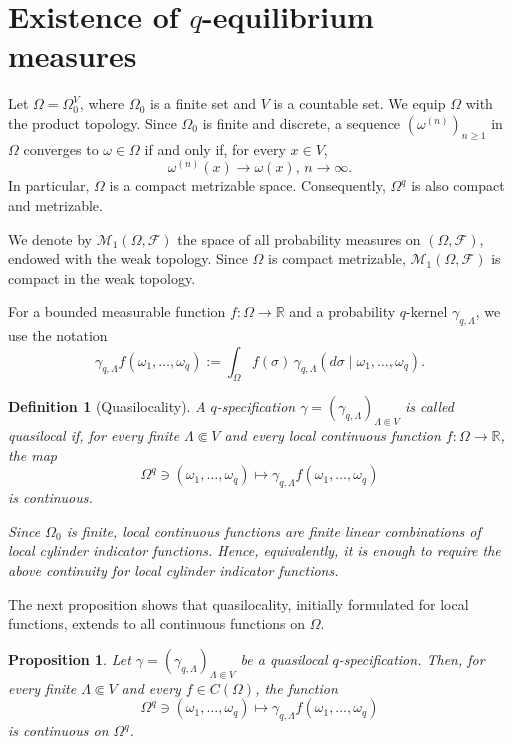 \documentclass[11pt,reqno]{amsart}
\newtheorem{defn}{Definition}
\newtheorem{pro}{Proposition}
\numberwithin{equation}{section} \setcounter{tocdepth}{1}
\begin{document}
\section{Existence of $q$-equilibrium measures}
\label{sec:existence}

Let $\Omega=\Omega_0^V$, where $\Omega_0$ is a finite set and $V$ is a
countable set. We equip $\Omega$ with the product topology. Since
$\Omega_0$ is finite and discrete, a sequence
$(\omega^{(n)})_{n\ge1}$ in $\Omega$ converges to $\omega\in\Omega$ if and
only if, for every $x\in V$,
\[
\omega^{(n)}(x)\to\omega(x), \, n\to\infty.
\]
In particular, $\Omega$ is a compact metrizable space. Consequently,
$\Omega^q$ is also compact and metrizable.

We denote by $\mathcal M_1(\Omega,\mathcal F)$ the space of all
probability measures on $(\Omega,\mathcal F)$, endowed with the weak
topology. Since $\Omega$ is compact metrizable,
$\mathcal M_1(\Omega,\mathcal F)$ is compact in the weak topology.

For a bounded measurable function $f:\Omega\to\mathbb R$ and a
probability $q$-kernel $\gamma_{q,\Lambda}$, we use the notation
\[
\gamma_{q,\Lambda}f(\omega_1,\ldots,\omega_q)
:=
\int_\Omega
f(\sigma)\,
\gamma_{q,\Lambda}
(d\sigma\mid\omega_1,\ldots,\omega_q).
\]

\begin{defn}[Quasilocality]
	A $q$-specification
	$\gamma=(\gamma_{q,\Lambda})_{\Lambda\Subset V}$ is called
	\emph{quasilocal} if, for every finite $\Lambda\Subset V$ and every
	local continuous function $f:\Omega\to\mathbb R$, the map
	\[
	\Omega^q\ni(\omega_1,\ldots,\omega_q)
	\longmapsto
	\gamma_{q,\Lambda}f(\omega_1,\ldots,\omega_q)
	\]
	is continuous.
	
	Since $\Omega_0$ is finite, local continuous functions are finite
	linear combinations of local cylinder indicator functions. Hence,
	equivalently, it is enough to require the above continuity for local
	cylinder indicator functions.
\end{defn}

The next proposition shows that quasilocality, initially formulated for
local functions, extends to all continuous functions on $\Omega$.

\begin{pro}\label{ql-extension}
	Let $\gamma=(\gamma_{q,\Lambda})_{\Lambda\Subset V}$ be a
	quasilocal $q$-specification. Then, for every finite
	$\Lambda\Subset V$ and every $f\in C(\Omega)$, the function
	\[
	\Omega^q\ni(\omega_1,\ldots,\omega_q)
	\longmapsto
	\gamma_{q,\Lambda}f(\omega_1,\ldots,\omega_q)
	\]
	is continuous on $\Omega^q$.
\end{pro}
\end{document}
